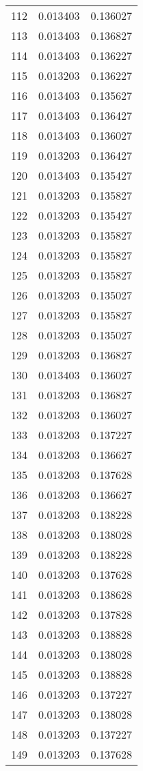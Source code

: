 \begin{longtable}{rrr}
112 & 0.013403 & 0.136027 \\
113 & 0.013403 & 0.136827 \\
114 & 0.013403 & 0.136227 \\
115 & 0.013203 & 0.136227 \\
116 & 0.013403 & 0.135627 \\
117 & 0.013403 & 0.136427 \\
118 & 0.013403 & 0.136027 \\
119 & 0.013203 & 0.136427 \\
120 & 0.013403 & 0.135427 \\
121 & 0.013203 & 0.135827 \\
122 & 0.013203 & 0.135427 \\
123 & 0.013203 & 0.135827 \\
124 & 0.013203 & 0.135827 \\
125 & 0.013203 & 0.135827 \\
126 & 0.013203 & 0.135027 \\
127 & 0.013203 & 0.135827 \\
128 & 0.013203 & 0.135027 \\
129 & 0.013203 & 0.136827 \\
130 & 0.013403 & 0.136027 \\
131 & 0.013203 & 0.136827 \\
132 & 0.013203 & 0.136027 \\
133 & 0.013203 & 0.137227 \\
134 & 0.013203 & 0.136627 \\
135 & 0.013203 & 0.137628 \\
136 & 0.013203 & 0.136627 \\
137 & 0.013203 & 0.138228 \\
138 & 0.013203 & 0.138028 \\
139 & 0.013203 & 0.138228 \\
140 & 0.013203 & 0.137628 \\
141 & 0.013203 & 0.138628 \\
142 & 0.013203 & 0.137828 \\
143 & 0.013203 & 0.138828 \\
144 & 0.013203 & 0.138028 \\
145 & 0.013203 & 0.138828 \\
146 & 0.013203 & 0.137227 \\
147 & 0.013203 & 0.138028 \\
148 & 0.013203 & 0.137227 \\
149 & 0.013203 & 0.137628 \\

\end{longtable}
